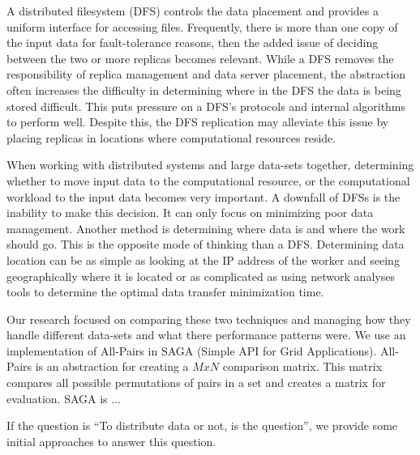 \documentclass{rspublic}
\newcommand{\micnote}[1]{ {\textcolor{blue} { ***Michael: #1 }}} \else
\newcommand{\jhanote}[1]{} \newcommand{\micnote}[1]{} \newcommand{\fixme}[1]{}
\begin{document}
A distributed filesystem (DFS) controls the data placement and provides a
uniform interface for accessing files.  Frequently, there is more than one copy
of the input data for fault-tolerance reasons, then the added issue of deciding
between the two or more replicas becomes relevant.  While a DFS removes the
responsibility of replica management and data server placement, the abstraction
often increases the difficulty in determining where in the DFS the data is
being stored difficult.  This puts pressure on a DFS's protocols and internal
algorithms to perform well.  Despite this, the DFS replication may alleviate
this issue by placing replicas in locations where computational resources
reside.

When working with distributed systems and large data-sets together, determining
whether to move input data to the computational resource, or the computational
workload to the input data becomes very important.  A downfall of DFSs is the
inability to make this decision.  It can only focus on minimizing poor data
management.  Another method is determining where data is and where the work
should go.  This is the opposite mode of thinking than a DFS.  Determining data
location can be as simple as looking at the IP address of the worker and seeing
geographically where it is located or as complicated as using network analyses
tools to determine the optimal data transfer minimization time.

Our research focused on comparing these two techniques and managing how they
handle different data-sets and what there performance patterns were.  We use an
implementation of All-Pairs in SAGA (Simple API for Grid Applications).
All-Pairs is an abstraction for creating a $MxN$ comparison matrix.  This
matrix compares all possible permutations of pairs in a set and creates a
matrix for evaluation.  SAGA is ...

If the question is ``To distribute data or not, is the question'', we provide
some initial approaches to answer this question.


\end{document}
